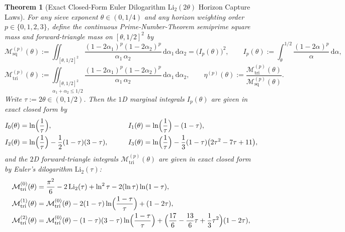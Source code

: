 \documentclass[11pt,reqno]{amsart}
\newtheorem{theorem}{Theorem}[section]
\theoremstyle{definition}
\theoremstyle{remark}
\numberwithin{equation}{section}
\newcommand{\dd}{\mathrm{d}}
\newcommand{\Li}{\mathrm{Li}}
\newcommand{\tri}{\mathrm{tri}}
\newcommand{\sq}{\mathrm{sq}}
\begin{document}
\begin{theorem}[Exact Closed-Form Euler Dilogarithm $\mathrm{Li}_2(2\theta)$ Horizon Capture Laws]\label{thm:dilogarithm-laws}
For any sieve exponent $\theta \in (0,1/4)$ and any horizon weighting order $p \in \{0,1,2,3\}$, define the continuous Prime-Number-Theorem semiprime square mass and forward-triangle mass on $[\theta,1/2]^2$ by
\begin{equation}\label{eq:M-sq-tri-defs}
\mathcal{M}_{\sq}^{(p)}(\theta) := \iint_{[\theta,1/2]^2} \frac{(1-2\alpha_1)^p(1-2\alpha_2)^p}{\alpha_1\,\alpha_2}\,\dd\alpha_1\,\dd\alpha_2 = \bigl(I_p(\theta)\bigr)^2, \qquad I_p(\theta) := \int_{\theta}^{1/2} \frac{(1-2\alpha)^p}{\alpha}\,\dd\alpha,
\end{equation}
\begin{equation}\label{eq:M-tri-integral}
\mathcal{M}_{\tri}^{(p)}(\theta) := \underset{\alpha_1 + \alpha_2 \le 1/2}{\iint_{[\theta,1/2]^2}} \frac{(1-2\alpha_1)^p(1-2\alpha_2)^p}{\alpha_1\,\alpha_2}\,\dd\alpha_1\,\dd\alpha_2, \qquad \eta^{(p)}(\theta) := \frac{\mathcal{M}_{\tri}^{(p)}(\theta)}{\mathcal{M}_{\sq}^{(p)}(\theta)}.
\end{equation}
Write $\tau := 2\theta \in (0,1/2)$. Then the $1$D marginal integrals $I_p(\theta)$ are given in exact closed form by
\begin{equation}\label{eq:Ip-closed}
\begin{aligned}
I_0(\theta) &= \ln\Bigl(\frac{1}{\tau}\Bigr), &\qquad I_1(\theta) &= \ln\Bigl(\frac{1}{\tau}\Bigr) - (1-\tau), \\
I_2(\theta) &= \ln\Bigl(\frac{1}{\tau}\Bigr) - \frac{1}{2}(1-\tau)(3-\tau), &\qquad I_3(\theta) &= \ln\Bigl(\frac{1}{\tau}\Bigr) - \frac{1}{3}(1-\tau)\bigl(2\tau^2 - 7\tau + 11\bigr),
\end{aligned}
\end{equation}
and the $2$D forward-triangle integrals $\mathcal{M}_{\tri}^{(p)}(\theta)$ are given in exact closed form by Euler's dilogarithm $\Li_2(\tau)$:
\begin{align}
\mathcal{M}_{\tri}^{(0)}(\theta) &= \frac{\pi^2}{6} - 2\,\Li_2(\tau) + \ln^2\tau - 2(\ln\tau)\ln(1-\tau), \label{eq:M-tri-0} \\
\mathcal{M}_{\tri}^{(1)}(\theta) &= \mathcal{M}_{\tri}^{(0)}(\theta) - 2(1-\tau)\ln\Bigl(\frac{1-\tau}{\tau}\Bigr) + (1-2\tau), \label{eq:M-tri-1} \\
\mathcal{M}_{\tri}^{(2)}(\theta) &= \mathcal{M}_{\tri}^{(0)}(\theta) - (1-\tau)(3-\tau)\ln\Bigl(\frac{1-\tau}{\tau}\Bigr) + \Bigl(\frac{17}{6} - \frac{13}{6}\tau + \frac{1}{3}\tau^2\Bigr)(1-2\tau), \label{eq:M-tri-2} \\

\end{align}
\end{theorem}
\end{document}
